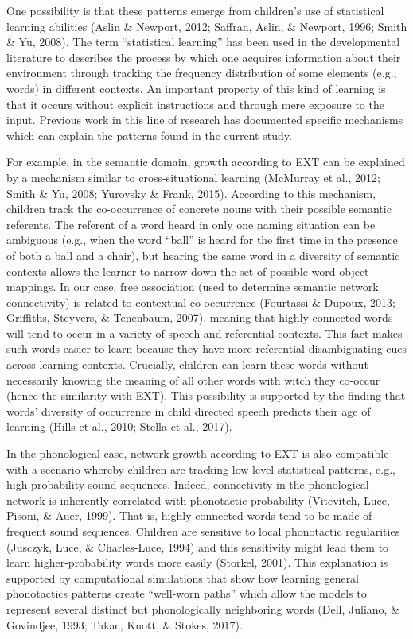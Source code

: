 \documentclass[english,floatsintext,man]{apa6}
\theoremstyle{definition}
\theoremstyle{definition}
\theoremstyle{definition}
\theoremstyle{remark}
\begin{document}
One possibility is that these patterns emerge from children's use of
statistical learning abilities (Aslin \& Newport, 2012; Saffran, Aslin,
\& Newport, 1996; Smith \& Yu, 2008). The term \enquote{statistical
learning} has been used in the developmental literature to describes the
process by which one acquires information about their environment
through tracking the frequency distribution of some elements (e.g.,
words) in different contexts. An important property of this kind of
learning is that it occurs without explicit instructions and through
mere exposure to the input. Previous work in this line of research has
documented specific mechanisms which can explain the patterns found in
the current study.

For example, in the semantic domain, growth according to EXT can be
explained by a mechanism similar to cross-situational learning (McMurray
et al., 2012; Smith \& Yu, 2008; Yurovsky \& Frank, 2015). According to
this mechanism, children track the co-occurrence of concrete nouns with
their possible semantic referents. The referent of a word heard in only
one naming situation can be ambiguous (e.g., when the word
\enquote{ball} is heard for the first time in the presence of both a
ball and a chair), but hearing the same word in a diversity of semantic
contexts allows the learner to narrow down the set of possible
word-object mappings. In our case, free association (used to determine
semantic network connectivity) is related to contextual co-occurrence
(Fourtassi \& Dupoux, 2013; Griffiths, Steyvers, \& Tenenbaum, 2007),
meaning that highly connected words will tend to occur in a variety of
speech and referential contexts. This fact makes such words easier to
learn because they have more referential disambiguating cues across
learning contexts. Crucially, children can learn these words without
necessarily knowing the meaning of all other words with witch they
co-occur (hence the similarity with EXT). This possibility is supported
by the finding that words' diversity of occurrence in child directed
speech predicts their age of learning (Hills et al., 2010; Stella et
al., 2017).

In the phonological case, network growth according to EXT is also
compatible with a scenario whereby children are tracking low level
statistical patterns, e.g., high probability sound sequences. Indeed,
connectivity in the phonological network is inherently correlated with
phonotactic probability (Vitevitch, Luce, Pisoni, \& Auer, 1999). That
is, highly connected words tend to be made of frequent sound sequences.
Children are sensitive to local phonotactic regularities (Jusczyk, Luce,
\& Charles-Luce, 1994) and this sensitivity might lead them to learn
higher-probability words more easily (Storkel, 2001). This explanation
is supported by computational simulations that show how learning general
phonotactics patterns create \enquote{well-worn paths} which allow the
models to represent several distinct but phonologically neighboring
words (Dell, Juliano, \& Govindjee, 1993; Takac, Knott, \& Stokes,
2017).
\end{document}
